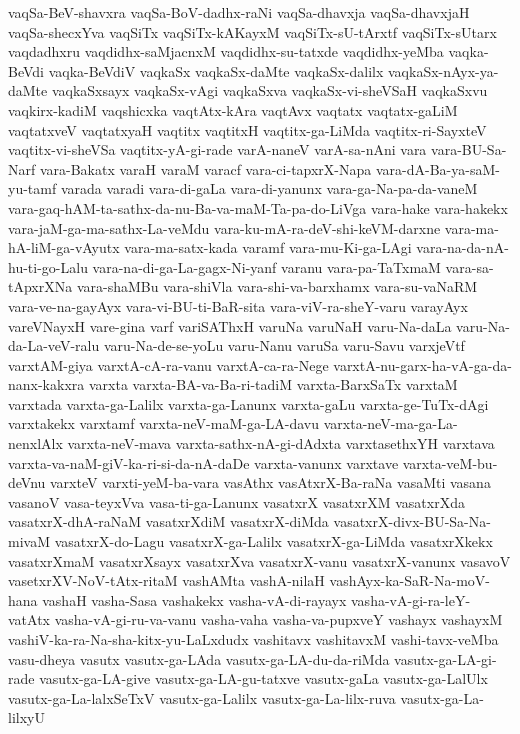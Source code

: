 {vaqSa-BeV-shavxra
vaqSa-BoV-dadhx-raNi
vaqSa-dhavxja
vaqSa-dhavxjaH
vaqSa-shecxYva
vaqSiTx
vaqSiTx-kAKayxM
vaqSiTx-sU-tArxtf
vaqSiTx-sUtarx
vaqdadhxru
vaqdidhx-saMjacnxM
vaqdidhx-su-tatxde
vaqdidhx-yeMba
vaqka-BeVdi
vaqka-BeVdiV
vaqkaSx
vaqkaSx-daMte
vaqkaSx-dalilx
vaqkaSx-nAyx-ya-daMte
vaqkaSxsayx
vaqkaSx-vAgi
vaqkaSxva
vaqkaSx-vi-sheVSaH
vaqkaSxvu
vaqkirx-kadiM
vaqshicxka
vaqtAtx-kAra
vaqtAvx
vaqtatx
vaqtatx-gaLiM
vaqtatxveV
vaqtatxyaH
vaqtitx
vaqtitxH
vaqtitx-ga-LiMda
vaqtitx-ri-SayxteV
vaqtitx-vi-sheVSa
vaqtitx-yA-gi-rade
varA-naneV
varA-sa-nAni
vara
vara-BU-Sa-Narf
vara-Bakatx
varaH
varaM
varacf
vara-ci-tapxrX-Napa
vara-dA-Ba-ya-saM-yu-tamf
varada
varadi
vara-di-gaLa
vara-di-yanunx
vara-ga-Na-pa-da-vaneM
vara-gaq-hAM-ta-sathx-da-nu-Ba-va-maM-Ta-pa-do-LiVga
vara-hake
vara-hakekx
vara-jaM-ga-ma-sathx-La-veMdu
vara-ku-mA-ra-deV-shi-keVM-darxne
vara-ma-hA-liM-ga-vAyutx
vara-ma-satx-kada
varamf
vara-mu-Ki-ga-LAgi
vara-na-da-nA-hu-ti-go-Lalu
vara-na-di-ga-La-gagx-Ni-yanf
varanu
vara-pa-TaTxmaM
vara-sa-tApxrXNa
vara-shaMBu
vara-shiVla
vara-shi-va-barxhamx
vara-su-vaNaRM
vara-ve-na-gayAyx
vara-vi-BU-ti-BaR-sita
vara-viV-ra-sheY-varu
varayAyx
vareVNayxH
vare-gina
varf
variSAThxH
varuNa
varuNaH
varu-Na-daLa
varu-Na-da-La-veV-ralu
varu-Na-de-se-yoLu
varu-Nanu
varuSa
varu-Savu
varxjeVtf
varxtAM-giya
varxtA-cA-ra-vanu
varxtA-ca-ra-Nege
varxtA-nu-garx-ha-vA-ga-da-nanx-kakxra
varxta
varxta-BA-va-Ba-ri-tadiM
varxta-BarxSaTx
varxtaM
varxtada
varxta-ga-Lalilx
varxta-ga-Lanunx
varxta-gaLu
varxta-ge-TuTx-dAgi
varxtakekx
varxtamf
varxta-neV-maM-ga-LA-davu
varxta-neV-ma-ga-La-nenxlAlx
varxta-neV-mava
varxta-sathx-nA-gi-dAdxta
varxtasethxYH
varxtava
varxta-va-naM-giV-ka-ri-si-da-nA-daDe
varxta-vanunx
varxtave
varxta-veM-bu-deVnu
varxteV
varxti-yeM-ba-vara
vasAthx
vasAtxrX-Ba-raNa
vasaMti
vasana
vasanoV
vasa-teyxVva
vasa-ti-ga-Lanunx
vasatxrX
vasatxrXM
vasatxrXda
vasatxrX-dhA-raNaM
vasatxrXdiM
vasatxrX-diMda
vasatxrX-divx-BU-Sa-Na-mivaM
vasatxrX-do-Lagu
vasatxrX-ga-Lalilx
vasatxrX-ga-LiMda
vasatxrXkekx
vasatxrXmaM
vasatxrXsayx
vasatxrXva
vasatxrX-vanu
vasatxrX-vanunx
vasavoV
vasetxrXV-NoV-tAtx-ritaM
vashAMta
vashA-nilaH
vashAyx-ka-SaR-Na-moV-hana
vashaH
vasha-Sasa
vashakekx
vasha-vA-di-rayayx
vasha-vA-gi-ra-leY-vatAtx
vasha-vA-gi-ru-va-vanu
vasha-vaha
vasha-va-pupxveY
vashayx
vashayxM
vashiV-ka-ra-Na-sha-kitx-yu-LaLxdudx
vashitavx
vashitavxM
vashi-tavx-veMba
vasu-dheya
vasutx
vasutx-ga-LAda
vasutx-ga-LA-du-da-riMda
vasutx-ga-LA-gi-rade
vasutx-ga-LA-give
vasutx-ga-LA-gu-tatxve
vasutx-gaLa
vasutx-ga-LalUlx
vasutx-ga-La-lalxSeTxV
vasutx-ga-Lalilx
vasutx-ga-La-lilx-ruva
vasutx-ga-La-lilxyU
}
